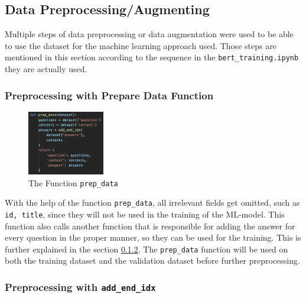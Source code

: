         \subsection{Data Preprocessing/Augmenting}
        \label{subsec:-data-preprocessing-augmenting}

            Multiple steps of data preprocessing or data augmentation were used to be able to use the dataset for the machine learning approach used. 
            Those steps are mentioned in this section according to the sequence in the \texttt{bert\_training.ipynb} they are actually used.

            \subsubsection{Preprocessing with Prepare Data Function}
            \label{subsubsec:-preparing-data-with-prep-data}
            
                \begin{figure}
                    \caption{The Function \texttt{prep\_data}}
                    \begin{center}
                        \includegraphics[width=0.3\textwidth]{figures/prep_data_function.png}
                    \end{center}
                    \label{fig:-preparing-data-with-prep-data-function}
                \end{figure}
                With the help of the function \texttt{prep\_data}, all irrelevant fields get omitted, such as \texttt{id, title}, since they will not be used in the training of the ML-model.
                This function also calls another function that is responsible for adding the answer for every question in the proper manner, so they can be used for the training. This is further explained in the section \ref{section:-preparing-data-with-add-end-idx}.
                The \texttt{prep\_data} function will be used on both the training dataset and the validation dataset before further preprocessing.


            \subsubsection{Preprocessing with \texttt{add\_end\_idx}}
            \label{section:-preparing-data-with-add-end-idx}

